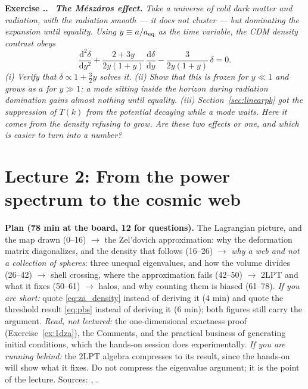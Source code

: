 \documentclass[a4paper,11pt]{article}
\newcommand{\dd}{\mathrm{d}}
\numberwithin{equation}{section}
\newenvironment{plan}{\par\noindent}{\par}
\newcounter{exercise}[section]
\renewcommand{\theexercise}{\thesection.\arabic{exercise}}
\newenvironment{exercise}
  {\par\medskip\noindent\refstepcounter{exercise}\textbf{Exercise \theexercise.}\ \itshape}
  {\par\medskip}
\begin{document}
\begin{exercise}\label{ex:meszaros}
\textbf{The M\'esz\'aros effect.} Take a universe of cold dark matter and
radiation, with the radiation smooth --- it does not cluster --- but dominating
the expansion until equality. Using $y \equiv a/a_{\rm eq}$ as the time
variable, the CDM density contrast obeys
\begin{equation*}
\frac{\dd^2\delta}{\dd y^2}
+ \frac{2+3y}{2y(1+y)}\,\frac{\dd\delta}{\dd y}
- \frac{3}{2y(1+y)}\,\delta = 0 .
\end{equation*}
(i) Verify that $\delta \propto 1 + \tfrac32 y$ solves it.
(ii) Show that this is frozen for $y\ll1$ and grows as $a$ for $y\gg1$: a mode
sitting inside the horizon during radiation domination gains almost nothing
until equality.
(iii) Section~\ref{sec:linearpk} got the suppression of $T(k)$ from the
\emph{potential} decaying while a mode waits. Here it comes from the
\emph{density} refusing to grow. Are these two effects or one, and which is
easier to turn into a number?
\end{exercise}

\section*{Lecture 2: From the power spectrum to the cosmic web}
\setcounter{section}{2}
\setcounter{subsection}{0}
\setcounter{equation}{0}
\setcounter{exercise}{0}

\begin{plan}
\noindent\textbf{Plan (78 min at the board, 12 for questions).} The Lagrangian
picture, and the map drawn (0--16) $\rightarrow$ the Zel'dovich approximation:
why the deformation matrix diagonalizes, and the density that follows (16--26)
$\rightarrow$ \emph{why a web and not a collection of spheres}: three unequal
eigenvalues, and how the volume divides (26--42) $\rightarrow$ shell crossing,
where the approximation fails (42--50) $\rightarrow$ 2LPT and what it fixes
(50--61) $\rightarrow$ halos, and why counting them is biased (61--78).
\emph{If you are short:} quote \eqref{eq:za_density} instead of deriving it
($4$ min) and quote the threshold result \eqref{eq:pbs} instead of deriving it
($6$ min); both figures still carry the argument. \emph{Read, not
lectured:} the one-dimensional exactness proof (Exercise~\ref{ex:1dza}), the
Comments, and the practical business of generating initial conditions, which the hands-on session does experimentally. \emph{If you are running behind:} the
2LPT algebra compresses to its result, since the hands-on will show what it
fixes. Do not compress the eigenvalue argument; it is the point of the lecture.
Sources: \cite[Apps.~A and E]{Jeong2010}, \cite{Zeldovich1970,DodelsonSchmidt}.
\end{plan}
\end{document}
